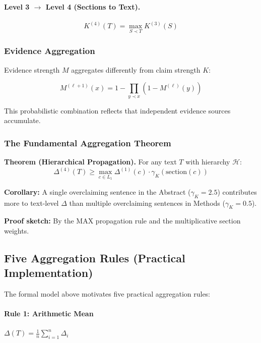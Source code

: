 \paragraph{Level 3 $\rightarrow$ Level 4 (Sections to Text).}
\begin{equation}
K^{(4)}(T) = \max_{S \prec T} K^{(3)}(S)
\end{equation}

\subsubsection{Evidence Aggregation}

Evidence strength $M$ aggregates differently from claim strength $K$:

\begin{equation}
M^{(\ell+1)}(x) = 1 - \prod_{y \prec x} (1 - M^{(\ell)}(y))
\end{equation}

This probabilistic combination reflects that independent evidence sources accumulate.

\subsubsection{The Fundamental Aggregation Theorem}

\begin{assumptionbox}
\textbf{Theorem (Hierarchical Propagation).}
For any text $T$ with hierarchy $\mathcal{H}$:
\begin{equation}
\Delta^{(4)}(T) \geq \max_{c \in L_1} \Delta^{(1)}(c) \cdot \gamma_K(\text{section}(c))
\end{equation}

\textbf{Corollary:} A single overclaiming sentence in the Abstract ($\gamma_K = 2.5$) contributes more to text-level $\Delta$ than multiple overclaiming sentences in Methods ($\gamma_K = 0.5$).

\textbf{Proof sketch:} By the MAX propagation rule and the multiplicative section weights.
\end{assumptionbox}


\subsection{Five Aggregation Rules (Practical Implementation)}

The formal model above motivates five practical aggregation rules:

\paragraph{Rule 1: Arithmetic Mean}
$\Delta(T) = \frac{1}{n} \sum_{i=1}^{n} \Delta_i$

